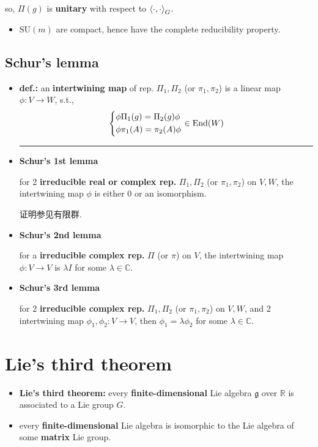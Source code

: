 \begin{itemize}
\begin{tcolorbox}[title=proof:]
		so, $\Pi(g)$ is \textbf{unitary} with respect to $\braket{\cdot, \cdot}_G$.
	\end{tcolorbox}
	
	\begin{itemize}
		\item $\mathrm{SU}(m)$ are compact, hence have the complete reducibility property.
	\end{itemize}
\end{itemize}

\subsection{Schur's lemma}
\begin{itemize}
	\item \textbf{def.:} an \textbf{intertwining map} of rep. $\Pi_1, \Pi_2$ (or $\pi_1, \pi_2$) is a linear map $\phi : V \rightarrow W$, s.t.,
	\begin{equation}
		\begin{dcases}
			\phi \Pi_1(g) = \Pi_2(g) \phi \\
			\phi \pi_1(A) = \pi_2(A) \phi
		\end{dcases} \in \mathrm{End}(W)
	\end{equation}
	
	\noindent\rule[0.5ex]{\linewidth}{0.5pt} %
	
	\item \textbf{Schur's 1st lemma}
	
	for 2 \textbf{irreducible real or complex rep.} $\Pi_1, \Pi_2$ (or $\pi_1, \pi_2$) on $V, W$, the intertwining map $\phi$ is either $0$ or an isomorphism.
	
	证明参见有限群.
	
	\item \textbf{Schur's 2nd lemma}
	
	for a \textbf{irreducible complex rep.} $\Pi$ (or $\pi$) on $V$, the intertwining map $\phi : V \rightarrow V$ is $\lambda I$ for some $\lambda \in \mathbb{C}$.
	
	\item \textbf{Schur's 3rd lemma}
	
	for 2 \textbf{irreducible complex rep.} $\Pi_1, \Pi_2$ (or $\pi_1, \pi_2$) on $V, W$, and 2 intertwining map $\phi_1, \phi_2 : V \rightarrow V$, then $\phi_1 = \lambda \phi_2$ for some $\lambda \in \mathbb{C}$.
\end{itemize}

\section{Lie's third theorem}
\begin{itemize}
	\item \textbf{Lie's third theorem:} every \textbf{finite-dimensional} Lie algebra $\mathfrak{g}$ over $\mathbb{R}$ is associated to a Lie group $G$.
	
	\item every \textbf{finite-dimensional} Lie algebra is isomorphic to the Lie algebra of some \textbf{matrix} Lie group.
\end{itemize}

